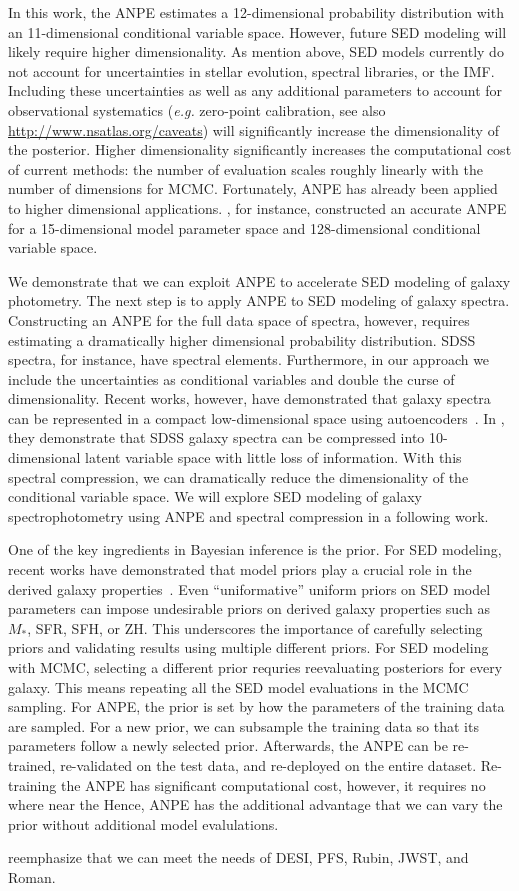 In this work, the ANPE estimates a 12-dimensional probability distribution with
an 11-dimensional conditional variable space. 
However, future SED modeling will likely require higher dimensionality. 
As mention above, SED models currently do not account for uncertainties in
stellar evolution, spectral libraries, or the IMF. 
Including these uncertainties as well as any additional parameters to account
for observational systematics (\emph{e.g.} zero-point calibration, see also
\url{http://www.nsatlas.org/caveats}) will significantly increase the
dimensionality of the posterior. 
Higher dimensionality significantly increases the computational cost of current
methods: the number of evaluation scales roughly linearly with the number of
dimensions for MCMC. 
Fortunately, ANPE has already been applied to higher dimensional applications.
\cite{dax2021}, for instance, constructed an accurate ANPE for a 15-dimensional
model parameter space and 128-dimensional conditional variable space.  

We demonstrate that we can exploit ANPE to accelerate SED modeling of galaxy
photometry. 
The next step is to apply ANPE to SED modeling of galaxy spectra. 
Constructing an ANPE for the full data space of spectra, however, requires
estimating a dramatically higher dimensional probability distribution. 
SDSS spectra, for instance, have  spectral elements.  
Furthermore, in our approach we include the uncertainties as conditional
variables and double the curse of dimensionality.
Recent works, however, have demonstrated that galaxy spectra can be represented
in a compact low-dimensional space using autoencoders~\citep[][; Melchior \&
Hahn in prep.]{portillo2020}.
In \cite{portillo2020}, they demonstrate that SDSS galaxy spectra can be
compressed into 10-dimensional latent variable space with little loss of
information. 
With this spectral compression, we can dramatically reduce the dimensionality
of the conditional variable space. 
We will explore SED modeling of galaxy spectrophotometry using ANPE and
spectral compression in a following work. 

One of the key ingredients in Bayesian inference is the prior. 
For SED modeling, recent works have demonstrated that model priors play a
crucial role in the derived galaxy properties~\citep{carnall2018, leja2019,
hahn2022}. 
Even ``uniformative'' uniform priors on SED model parameters can impose
undesirable priors on derived galaxy properties such as $M_*$, SFR, SFH, or
ZH.
This underscores the importance of carefully selecting priors and validating
results using multiple different priors. 
For SED modeling with MCMC, selecting a different prior requries reevaluating
posteriors for every galaxy. 
This means repeating all the SED model evaluations in the MCMC sampling. 
For ANPE, the prior is set by how the parameters of the training data are
sampled. 
For a new prior, we can subsample the training data so that its parameters
follow a newly selected prior. 
Afterwards, the ANPE can be re-trained, re-validated on the test data, and
re-deployed on the entire dataset.
Re-training the ANPE has significant computational cost, however, it requires
no where near the 
Hence, ANPE has the additional advantage that we can vary the prior without
additional model evalulations.

reemphasize that we can meet the needs of DESI, PFS, Rubin, JWST, and Roman. 
